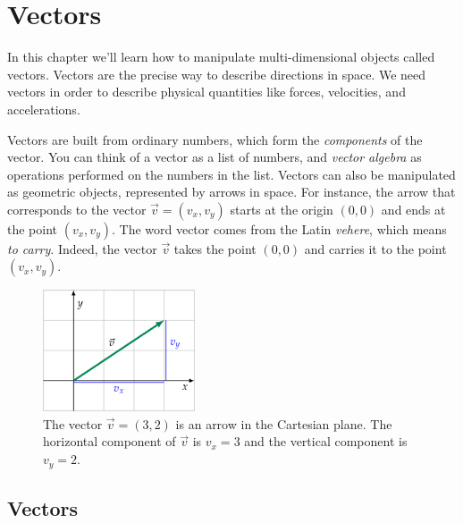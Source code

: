 
%
%

\chapter{Vectors}
\label{chapter:vectors}

In this chapter we'll learn how to manipulate multi-dimensional objects called vectors.						
Vectors are the precise way to describe directions in space.
We need vectors in order to describe physical quantities like forces, velocities, and accelerations.

Vectors are built from ordinary numbers,
which form the \emph{components} of the vector.
You can think of a vector as a list of numbers,
and \emph{vector algebra} as operations
performed on the numbers in the list.
Vectors can also be manipulated as geometric objects,
represented by arrows in space.
For instance, the arrow that corresponds to the vector $\vec{v}=(v_x,v_y)$ starts at the origin $(0,0)$
and ends at the point $(v_x,v_y)$.
The word vector comes from the Latin \emph{vehere},
which means \emph{to carry}.
Indeed, the vector $\vec{v}$ takes the point $(0,0)$ and carries it to the point $(v_x,v_y)$.

\begin{figure}[H]
	\centering
	\includegraphics[width=0.4\textwidth]{images/figures/vectors/vector_components.png}
	\vspace{-2mm}
	\caption{	The vector $\vec{v}=(3,2)$ is an arrow in the Cartesian plane.
			The horizontal component of $\vec{v}$ is $v_x=3$
			and the vertical component  is $v_y=2$.\label{fig:vector_components}}
	
\end{figure}





\section{Vectors}
\label{sec:vectors}

